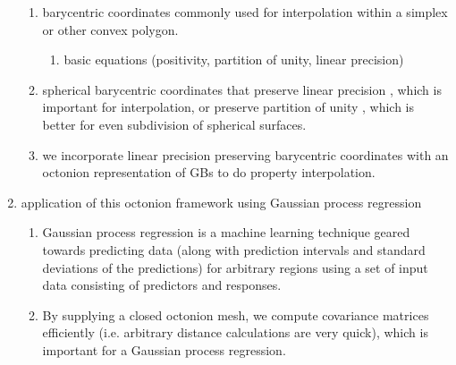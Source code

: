 \documentclass[preprint,12pt]{elsarticle}
\begin{document}
\begin{enumerate}
\begin{enumerate}
        \item barycentric coordinates commonly used for interpolation within a simplex or other convex polygon.
        \begin{enumerate}
            \item basic equations (positivity, partition of unity, linear precision) \cite{Langer2006SphericalCoordinates}
        \end{enumerate}
        \item spherical barycentric coordinates that preserve linear precision \cite{Langer2006SphericalCoordinates}, which is important for interpolation, or preserve partition of unity \cite{Lei2020ASystems}, which is better for even subdivision of spherical surfaces.
        \item we incorporate linear precision preserving barycentric coordinates with an octonion representation of GBs to do property interpolation.
    \end{enumerate}
    \item application of this octonion framework using Gaussian process regression
    \begin{enumerate}
        \item Gaussian process regression is a machine learning technique geared towards predicting data (along with prediction intervals and standard deviations of the predictions) for arbitrary regions using a set of input data consisting of predictors and responses.
        \item By supplying a closed octonion mesh, we compute covariance matrices efficiently (i.e. arbitrary distance calculations are very quick), which is important for a Gaussian process regression.
    \end{enumerate}
\end{enumerate}
\end{document}
